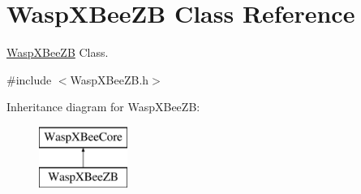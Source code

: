 \hypertarget{class_wasp_x_bee_z_b}{}\section{Wasp\+X\+Bee\+ZB Class Reference}
\label{class_wasp_x_bee_z_b}


\hyperlink{class_wasp_x_bee_z_b}{Wasp\+X\+Bee\+ZB} Class.  




{\ttfamily \#include $<$Wasp\+X\+Bee\+Z\+B.\+h$>$}

Inheritance diagram for Wasp\+X\+Bee\+ZB\+:\begin{figure}[H]
\begin{center}
\leavevmode
\includegraphics[height=2.000000cm]{class_wasp_x_bee_z_b}
\end{center}
\end{figure}
